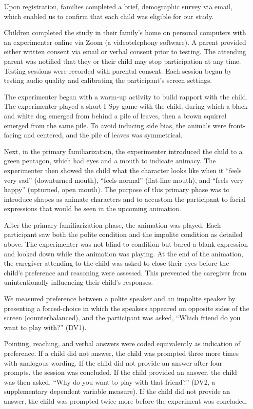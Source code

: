 \documentclass[
  english,
  man,floatsintext]{apa6}
\begin{document}
Upon registration, families completed a brief, demographic survey via email, which enabled us to confirm that each child was eligible for our study.

Children completed the study in their family's home on personal computers with an experimenter online via Zoom (a videotelephony software). A parent provided either written consent via email or verbal consent prior to testing. The attending parent was notified that they or their child may stop participation at any time. Testing sessions were recorded with parental consent. Each session began by testing audio quality and calibrating the participant's screen settings.

The experimenter began with a warm-up activity to build rapport with the child. The experimenter played a short I-Spy game with the child, during which a black and white dog emerged from behind a pile of leaves, then a brown squirrel emerged from the same pile. To avoid inducing side bias, the animals were front-facing and centered, and the pile of leaves was symmetrical.

Next, in the primary familiarization, the experimenter introduced the child to a green pentagon, which had eyes and a mouth to indicate animacy. The experimenter then showed the child what the character looks like when it ``feels very sad'' (downturned mouth), ``feels normal'' (flat-line mouth), and ``feels very happy'' (upturned, open mouth). The purpose of this primary phase was to introduce shapes as animate characters and to accustom the participant to facial expressions that would be seen in the upcoming animation.

After the primary familiarization phase, the animation was played. Each participant saw both the polite condition and the impolite condition as detailed above. The experimenter was not blind to condition but bared a blank expression and looked down while the animation was playing. At the end of the animation, the caregiver attending to the child was asked to close their eyes before the child's preference and reasoning were assessed. This prevented the caregiver from unintentionally influencing their child's responses.

We measured preference between a polite speaker and an impolite speaker by presenting a forced-choice in which the speakers appeared on opposite sides of the screen (counterbalanced), and the participant was asked, ``Which friend do you want to play with?'' (DV1).

Pointing, reaching, and verbal answers were coded equivalently as indication of preference. If a child did not answer, the child was prompted three more times with analogous wording. If the child did not provide an answer after four prompts, the session was concluded. If the child provided an answer, the child was then asked, ``Why do you want to play with that friend?'' (DV2, a supplementary dependent variable measure). If the child did not provide an answer, the child was prompted twice more before the experiment was concluded.
\end{document}
